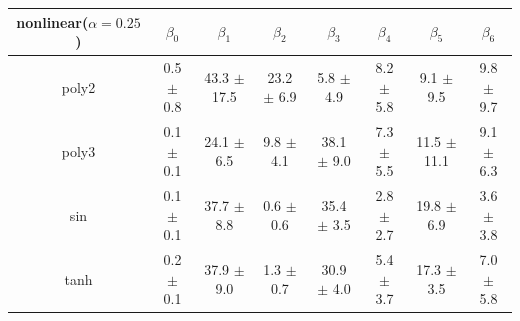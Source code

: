 \begin{tabular}{c|c|c|c|c|c|c|c}
    \hline
    nonlinear($\alpha=0.25$) & $\beta_0$ & $\beta_1$ & $\beta_2$ & $\beta_3$ & $\beta_4$ & $\beta_5$ & $\beta_6$ \\
    \hline
    poly2 & 0.5 $\pm$ 0.8 & 43.3 $\pm$ 17.5 & 23.2 $\pm$ 6.9 & 5.8 $\pm$ 4.9 & 8.2 $\pm$ 5.8 & 9.1 $\pm$ 9.5 & 9.8 $\pm$ 9.7 \\
    poly3 & 0.1 $\pm$ 0.1 & 24.1 $\pm$ 6.5 & 9.8 $\pm$ 4.1 & 38.1 $\pm$ 9.0 & 7.3 $\pm$ 5.5 & 11.5 $\pm$ 11.1 & 9.1 $\pm$ 6.3 \\
    sin & 0.1 $\pm$ 0.1 & 37.7 $\pm$ 8.8 & 0.6 $\pm$ 0.6 & 35.4 $\pm$ 3.5 & 2.8 $\pm$ 2.7 & 19.8 $\pm$ 6.9 & 3.6 $\pm$ 3.8 \\
    tanh & 0.2 $\pm$ 0.1 & 37.9 $\pm$ 9.0 & 1.3 $\pm$ 0.7 & 30.9 $\pm$ 4.0 & 5.4 $\pm$ 3.7 & 17.3 $\pm$ 3.5 & 7.0 $\pm$ 5.8 \\
    \hline
\end{tabular}
